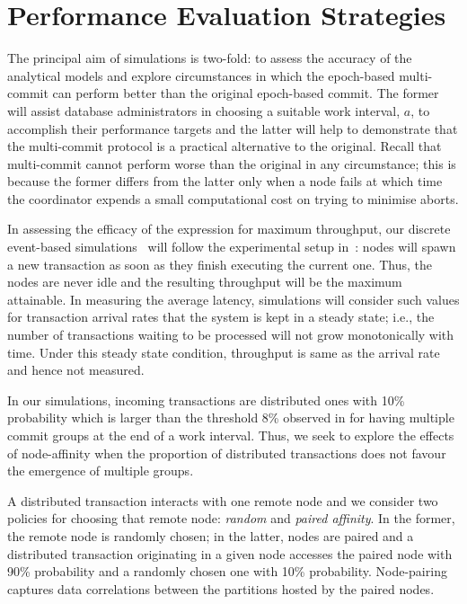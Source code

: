\section{Performance Evaluation Strategies}
\label{sec:perf-eval-strat}

The principal aim of simulations is two-fold: to assess the accuracy of the analytical models and explore 
circumstances in which the epoch-based multi-commit can perform better than the original epoch-based commit. The former will assist  database administrators in choosing a suitable work interval, $a$, to accomplish their performance targets and the latter will help to demonstrate that the multi-commit protocol is a practical alternative to the original. Recall that multi-commit cannot perform worse than the original in any circumstance; this is because the former differs from the latter only when a node fails at which time the coordinator expends a small computational cost on trying to minimise aborts. 

In assessing the efficacy of the expression for maximum throughput, our  discrete event-based simulations~\cite{mitrani} will follow the experimental setup in~\cite{lu}: nodes will spawn a new transaction as soon as they finish executing the current one. Thus, the nodes are never idle and the resulting throughput will be the maximum attainable. In measuring the average latency, simulations will consider such values for transaction arrival rates that the system is kept in a steady state; i.e., the number of transactions waiting to be processed will not grow monotonically with time. Under this steady state condition, throughput is same as the arrival rate and hence not measured.

In our simulations, incoming transactions are distributed ones with 10\% probability which is larger than the 
threshold 8\% observed in  for having multiple commit groups at the end of a work interval. Thus, 
we seek to explore the effects of  node-affinity when the proportion of distributed transactions does not 
favour the emergence of multiple groups.

A distributed  transaction  interacts with one remote node and we consider two policies for choosing that  
remote node: \emph{random} and \emph{paired affinity}.
In the former, the remote node is randomly chosen; in the latter, nodes are paired  and a distributed 
transaction originating in a given node accesses the paired node with 90\% probability and a randomly chosen 
one with 10\% probability. Node-pairing captures data correlations between the partitions hosted by the paired 
nodes. 


